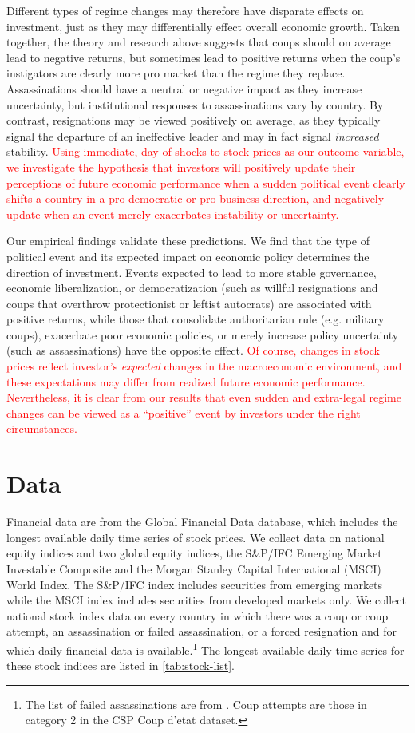 \documentclass[12pt,final,fleqn]{article}
\theoremstyle{plain}
\begin{document}
Different types of regime changes may therefore have disparate effects on investment, just as they may differentially effect overall economic growth. Taken together, the theory and research above suggests that coups should on average lead to negative returns, but sometimes lead to positive returns when the coup's instigators are clearly more pro market than the regime they replace. Assassinations should have a neutral or negative impact as they increase uncertainty, but institutional responses to assassinations vary by country. By contrast, resignations may be viewed positively on average, as they typically signal the departure of an ineffective leader and may in fact signal \textit{increased} stability. \textcolor{red}{Using immediate, day-of shocks to stock prices as our outcome variable, we investigate the hypothesis that investors will positively update their perceptions of future economic performance when a sudden political event clearly shifts a country in a pro-democratic or pro-business direction, and negatively update when an event merely exacerbates instability or uncertainty.}

Our empirical findings validate these predictions. We find that the type of political event and its expected impact on economic policy determines the direction of investment. Events expected to lead to more stable governance, economic liberalization, or democratization (such as willful resignations and coups that overthrow protectionist or leftist autocrats) are associated with positive returns, while those that consolidate authoritarian rule (e.g. military coups), exacerbate poor economic policies, or merely increase policy uncertainty (such as assassinations) have the opposite effect. \textcolor{red}{Of course, changes in stock prices reflect investor's \textit{expected} changes in the macroeconomic environment, and these expectations may differ from realized future economic performance. Nevertheless, it is clear from our results that even sudden and extra-legal regime changes can be viewed as a ``positive'' event by investors under the right circumstances.}

\section{Data}

Financial data are from the Global Financial Data database, which includes the longest available daily time series of stock prices. We collect data on national equity indices and two global equity indices, the S\&P/IFC Emerging Market Investable Composite and the Morgan Stanley Capital International (MSCI) World Index. The S\&P/IFC index includes securities from emerging markets while the MSCI index includes securities from developed markets only. We collect national stock index data on every country in which there was a coup or coup attempt, an assassination or failed assassination, or a forced resignation and for which daily financial data is available.\footnote{The list of failed assassinations are from \citet{jones2009hit}. Coup attempts are those in category 2 in the CSP Coup d'etat dataset.} The longest available daily time series for these stock indices are listed in \autoref{tab:stock-list}.
\end{document}
